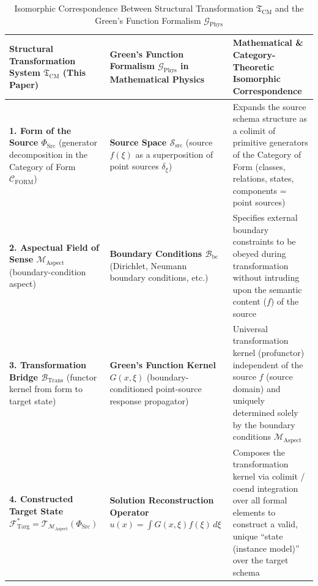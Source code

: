 \documentclass[11pt,a4paper]{article}
\theoremstyle{definition}
\theoremstyle{plain}
\theoremstyle{remark}
\newcommand{\CFORM}{\mathcal{C}_{\mathrm{FORM}}}
\newcommand{\MAspect}{\mathcal{M}_{\mathrm{Aspect}}}
\newcommand{\BTrans}{\mathcal{B}_{\mathrm{Trans}}}
\begin{document}
\begin{table}[htbp]
\centering
\caption{Isomorphic Correspondence Between Structural Transformation $\mathfrak{T}_{\mathrm{CM}}$ and the Green's Function Formalism $\mathcal{G}_{\mathrm{Phys}}$}
\label{tab:green-correspondence}
\renewcommand{\arraystretch}{1.35}
\begin{tabularx}{\textwidth}{>{\raggedright\arraybackslash}p{} >{\raggedright\arraybackslash}p{} >{\raggedright\arraybackslash}X}
\toprule
\textbf{Structural Transformation System $\mathfrak{T}_{\mathrm{CM}}$ (This Paper)} & \textbf{Green's Function Formalism $\mathcal{G}_{\mathrm{Phys}}$ in Mathematical Physics} & \textbf{Mathematical \& Category-Theoretic Isomorphic Correspondence} \\
\midrule
\textbf{1. Form of the Source $\Phi_{\mathrm{Src}}$} (generator decomposition in the Category of Form $\CFORM$) & \textbf{Source Space $\mathcal{S}_{\mathrm{src}}$} (source $f(\xi)$ as a superposition of point sources $\delta_\xi$) & Expands the source schema structure as a colimit of primitive generators of the Category of Form (classes, relations, states, components = point sources) \\
\textbf{2. Aspectual Field of Sense $\MAspect$} (boundary-condition aspect) & \textbf{Boundary Conditions $\mathcal{B}_{\mathrm{bc}}$} (Dirichlet, Neumann boundary conditions, etc.) & Specifies external boundary constraints to be obeyed during transformation without intruding upon the semantic content ($f$) of the source \\
\textbf{3. Transformation Bridge $\BTrans$} (functor kernel from form to target state) & \textbf{Green's Function Kernel $G(x, \xi)$} (boundary-conditioned point-source response propagator) & Universal transformation kernel (profunctor) independent of the source $f$ (source domain) and uniquely determined solely by the boundary conditions $\MAspect$ \\
\textbf{4. Constructed Target State $\mathcal{F}_{\mathrm{Targ}}^* = \mathcal{T}_{\MAspect}(\Phi_{\mathrm{Src}})$} & \textbf{Solution Reconstruction Operator $u(x) = \int G(x, \xi) f(\xi)\, d\xi$} & Composes the transformation kernel via colimit / coend integration over all formal elements to construct a valid, unique ``state (instance model)'' over the target schema \\
\bottomrule
\end{tabularx}
\end{table}
\end{document}
